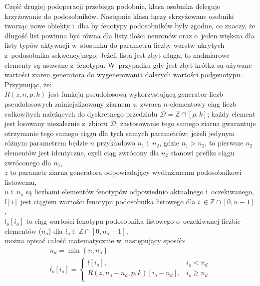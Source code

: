 Część drugiej podoperacji przebiega podobnie,
klasa osobnika deleguje krzyżowanie do podosobników.
Następnie klasa łączy skrzyżowane osobniki tworząc
nowe obiekty i~dba by fenotypy podosobników były zgodne,
co znaczy, że długość list powinna być równa
dla listy ilości neuronów oraz o~jeden większa
dla listy typów aktywacji w~stosunku do parametru
liczby warstw ukrytych z~podosobnika sekwencyjnego.
Jeżeli lista jest zbyt długa, to
nadmiarowe elementy są usuwane z~fenotypu.
W~przypadku gdy jest zbyt krótka są
używane wartości ziaren generatora
do wygenerowania dalszych wartości podgenotypu.
Przyjmując, że:\\
$R\left(z,n,p,k\right)$ jest funkcją
  pseudolosową wykorzystującą generator liczb
  pseudolosowych zainicjalizowany ziarnem $z$;
  zwraca $n$-elementowy ciąg liczb całkowitych
  należących do dyskretnego przedziału
  $\mathcal{D}=\mathbb{Z} \cap \left[p, k\right]$;
  każdy element jest losowany niezależnie
  z~zbioru $\mathcal{D}$;
  zastosowanie tego samego ziarna gwarantuje otrzymanie
  tego samego ciągu dla tych samych parametrów;
  jeżeli jedynym różnym parametrem będzie $n$
  przykładowo $n_1$ i~$n_2$, gdzie $n_1>n_2$,
  to pierwsze $n_2$ elementów jest identyczne,
  czyli ciąg zwrócony dla $n_2$ stanowi prefiks
  ciągu zwróconego dla $n_1$,\\
$z$ to parametr ziarna generatora odpowiadający
  wydłużanemu podosobnikowi listowemu,\\
$n$ i~$n_o$ są liczbami elementów fenotypów
  odpowiednio aktualnego i~oczekiwanego,\\
$l\left[i\right]$ jest ciągiem wartości
  fenotypu podosobnika listowego dla
  $i~\in \mathbb{Z} \cap \left[0, n-1\right]$,\\
$l_o\left[i_o\right]$ to ciąg wartości fenotypu
  podosobnika listowego o~oczekiwanej
  liczbie elementów ($n_o$) dla
  $i_o \in \mathbb{Z} \cap \left[0, n_o-1\right]$,\\
można opisać całość matematycznie w~następujący sposób:
\begin{equation}
  \label{eq:too_short_long}
  \begin{gathered}
    n_d=\min\left\{n, n_o\right\}\\
    l_o\left[i_o\right]=\begin{cases}
      l\left[i_o\right]
        ,& i_o < n_d\\
      {
        R\left(z, n_o-n_d, p, k\right)
      }{\left[i_o-n_d\right]}
        ,& i_o \geqslant n_d\\
    \end{cases}
  \end{gathered}
\end{equation}

